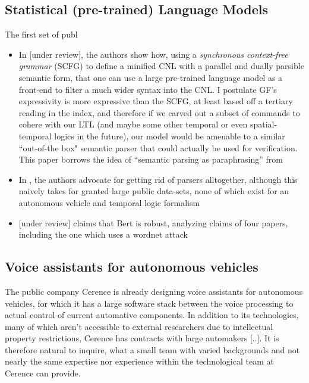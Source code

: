 \documentclass[a4paper, 11pt]{article}
\begin{document}
\subsection{Statistical (pre-trained) Language Models}
The first set of publ

\begin{itemize}

\item In \cite{fewShotSem} [under review], the authors show how, using a \emph{synchronous
context-free grammar} (SCFG) to define a minified CNL with a parallel and dually
parsible semantic form, that one can use a large pre-trained language model as a front-end
to filter a much wider syntax into the CNL. I postulate GF's expressivity is
more expressive than the SCFG, at least based off a tertiary reading in the
index, and therefore if we carved out a subset of commands to cohere with our
LTL (and maybe some other temporal or even spatial-temporal logics in the
future), our model would be amenable to a similar ``out-of-the box" semantic
parser that could actually be used for verification. This paper borrows the idea
of ``semantic parsing as paraphrasing'' from  \cite{berant-liang-2014-semantic}

\item In \cite{dontParse}, the authors advocate for getting rid of parsers
  alltogether, although this naively takes for granted large public data-sets,
  none of which exist for an autonomous vehicle and temporal logic formalism
\item  \cite{hauser2021bert} [under review] claims that Bert is robust, analyzing claims of four
  papers, including the one which uses a wordnet attack

\end{itemize}

\subsection{Voice assistants for autonomous vehicles}

The public company Cerence \cite{} is already designing voice assistants for autonomous
vehicles, for which it has a large software stack between the voice processing
to actual control of current automative components. In addition to its 
technologies, many of which aren't accessible to external researchers due to
intellectual property restrictions, Cerence has contracts with large automakers
[..]. It is therefore natural to inquire, what a small team with varied
backgrounds and not nearly the same expertise nor experience within the
technological team at Cerence can provide.
\end{document}
